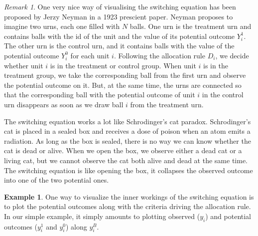 \documentclass[
]{book}
\theoremstyle{definition}
\theoremstyle{definition}
\newtheorem{example}{Example}[chapter]
\theoremstyle{definition}
\theoremstyle{definition}
\theoremstyle{remark}
\newtheorem*{remark}{Remark}
\begin{document}
\begin{remark}
\iffalse{} {Remark. } \fi{}One very nice way of visualising the switching equation has been proposed by Jerzy Neyman in a 1923 prescient paper.
Neyman proposes to imagine two urns, each one filled with \(N\) balls.
One urn is the treatment urn and contains balls with the id of the unit and the value of its potential outcome \(Y_i^1\).
The other urn is the control urn, and it contains balls with the value of the potential outcome \(Y_i^0\) for each unit \(i\).
Following the allocation rule \(D_i\), we decide whether unit \(i\) is in the treatment or control group.
When unit \(i\) is in the treatment group, we take the corresponding ball from the first urn and observe the potential outcome on it.
But, at the same time, the urns are connected so that the corresponding ball with the potential outcome of unit \(i\) in the control urn disappears as soon as we draw ball \(i\) from the treatment urn.

The switching equation works a lot like Schrodinger's cat paradox.
Schrodinger's cat is placed in a sealed box and receives a dose of poison when an atom emits a radiation.
As long as the box is sealed, there is no way we can know whether the cat is dead or alive.
When we open the box, we observe either a dead cat or a living cat, but we cannot observe the cat both alive and dead at the same time.
The switching equation is like opening the box, it collapses the observed outcome into one of the two potential ones.
\end{remark}

\begin{example}
\protect\hypertarget{exm:unnamed-chunk-6}{}{\label{exm:unnamed-chunk-6} }One way to visualize the inner workings of the switching equation is to plot the potential outcomes along with the criteria driving the allocation rule.
In our simple example, it simply amounts to plotting observed (\(y_i\)) and potential outcomes (\(y_i^1\) and \(y_i^0\)) along \(y_i^B\).
\end{example}
\end{document}
